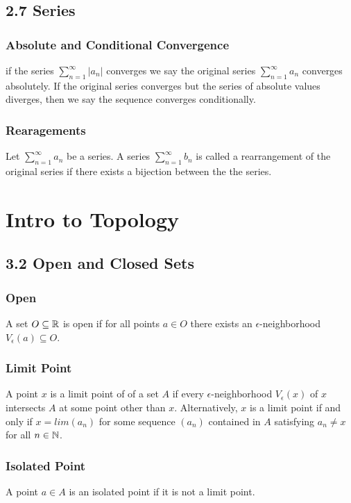 \documentclass{article}
\begin{document}
\subsection*{2.7 Series}
\subsubsection*{Absolute and Conditional Convergence}
if the series $\sum_{n=1}^{\infty} |a_n|$ converges we say the original series $\sum_{n=1}^{\infty} a_n$ converges absolutely. If the original series converges but the series of absolute values diverges, then we say the sequence converges conditionally.

\subsubsection*{Rearagements}
Let $\sum_{n=1}^{\infty} a_n$ be a series. A series $\sum_{n=1}^{\infty} b_n$ is called a rearrangement of the original series if there exists a bijection between the the series.

\section{Intro to Topology}
\subsection*{3.2 Open and Closed Sets}
\subsubsection*{Open}
A set $O \subseteq \protect\mathbb{R}$ is open if for all points $a \in O$ there exists an $\epsilon$-neighborhood $V_{\epsilon}(a) \subseteq O$.

\subsubsection*{Limit Point}
A point $x$ is a limit point of of a set $A$ if every $\epsilon$-neighborhood $V_\epsilon (x)$ of $x$ intersects $A$ at some point other than $x$.
Alternatively, $x$ is a limit point if and only if $x=lim(a_n)$ for some sequence $(a_n)$ contained in $A$ satisfying $a_n \ne x$ for all $n \in \protect\mathbb{N}$.

\subsubsection*{Isolated Point}
A point $a \in A$ is an isolated point if it is not a limit point.
\end{document}

